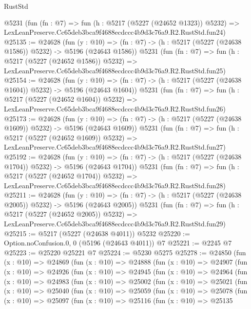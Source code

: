 \begin{lexlean}{RustStd}
\begin{coremodule}
    @5231
    (fun (fn : @7) =>
    fun (h : @5217 (@5227 (@24652 @1323)) @5232) =>
    LexLeanPreserve.Cc65deb3bca9f4688ecdccc4b9d3c76a9.R2.RustStd.fun24)
@25135 := @24628
    (fun (y : @10) => (fn : @7) -> (h : @5217 (@5227 (@24638 @1586)) @5232) -> @5196 (@24643 @1586))
    @5231
    (fun (fn : @7) =>
    fun (h : @5217 (@5227 (@24652 @1586)) @5232) =>
    LexLeanPreserve.Cc65deb3bca9f4688ecdccc4b9d3c76a9.R2.RustStd.fun25)
@25154 := @24628
    (fun (y : @10) => (fn : @7) -> (h : @5217 (@5227 (@24638 @1604)) @5232) -> @5196 (@24643 @1604))
    @5231
    (fun (fn : @7) =>
    fun (h : @5217 (@5227 (@24652 @1604)) @5232) =>
    LexLeanPreserve.Cc65deb3bca9f4688ecdccc4b9d3c76a9.R2.RustStd.fun26)
@25173 := @24628
    (fun (y : @10) => (fn : @7) -> (h : @5217 (@5227 (@24638 @1609)) @5232) -> @5196 (@24643 @1609))
    @5231
    (fun (fn : @7) =>
    fun (h : @5217 (@5227 (@24652 @1609)) @5232) =>
    LexLeanPreserve.Cc65deb3bca9f4688ecdccc4b9d3c76a9.R2.RustStd.fun27)
@25192 := @24628
    (fun (y : @10) => (fn : @7) -> (h : @5217 (@5227 (@24638 @1704)) @5232) -> @5196 (@24643 @1704))
    @5231
    (fun (fn : @7) =>
    fun (h : @5217 (@5227 (@24652 @1704)) @5232) =>
    LexLeanPreserve.Cc65deb3bca9f4688ecdccc4b9d3c76a9.R2.RustStd.fun28)
@25211 := @24628
    (fun (y : @10) => (fn : @7) -> (h : @5217 (@5227 (@24638 @2005)) @5232) -> @5196 (@24643 @2005))
    @5231
    (fun (fn : @7) =>
    fun (h : @5217 (@5227 (@24652 @2005)) @5232) =>
    LexLeanPreserve.Cc65deb3bca9f4688ecdccc4b9d3c76a9.R2.RustStd.fun29)
@25215 := @5217 (@5227 (@24638 @4011)) @5232
@25220 := Option.noConfusion.{0, 0} (@5196 (@24643 @4011)) @7
@25221 := @2245 @7
@25223 := @25220 @25221 @7
@25224 := @5230 @5275
@25278 := @24850
    (fun (x : @10) =>
    @24869
      (fun (x : @10) =>
      @24888
        (fun (x : @10) =>
        @24907
          (fun (x : @10) =>
          @24926
            (fun (x : @10) =>
            @24945
              (fun (x : @10) =>
              @24964
                (fun (x : @10) =>
                @24983
                  (fun (x : @10) =>
                  @25002
                    (fun (x : @10) =>
                    @25021
                      (fun (x : @10) =>
                      @25040
                        (fun (x : @10) =>
                        @25059
                          (fun (x : @10) =>
                          @25078
                            (fun (x : @10) =>
                            @25097
                              (fun (x : @10) =>
                              @25116
                                (fun (x : @10) =>
                                @25135

\end{coremodule}
\end{lexlean}
